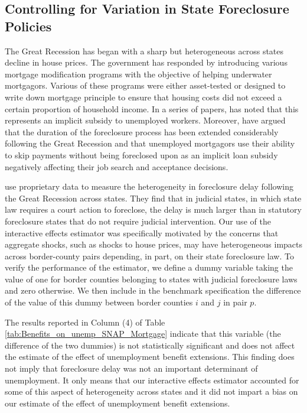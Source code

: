 \documentclass[12pt]{article}
\newcommand{\1}{\mathbf{1}}
\begin{document}
\begin{appendix}
\subsection{Controlling for Variation in State Foreclosure Policies}

The Great Recession has began with a sharp but heterogeneous across states decline in house prices. The government has responded by introducing various mortgage modification programs with the objective of helping underwater mortgagors. Various of these programs were either asset-tested or designed to write down mortgage principle to ensure that housing costs did not exceed a certain proportion of household income. In a series of papers, \citet{mulligan:08, mulligan:09, mulligan:10} has noted that this represents an implicit subsidy to unemployed workers. Moreover, \citet{herkenhoff+ohanian:13} have argued that the duration of the foreclosure process has been extended considerably following the Great Recession and that unemployed mortgagors use their ability to skip payments without being foreclosed upon as an implicit loan subsidy negatively affecting their job search and acceptance decisions.


\citet{cordell_etal:13} use proprietary data to measure the heterogeneity in foreclosure delay following the Great Recession across states. They find that in judicial states, in which state law requires a court action to foreclose, the delay is much larger than in statutory foreclosure states that do not require judicial intervention. Our use of the interactive effects estimator was specifically motivated by the concerns that aggregate shocks, such as shocks to house prices, may have heterogeneous impacts across border-county pairs depending, in part, on their state foreclosure law.  To verify the performance of the estimator, we define a dummy variable taking the value of one for border counties belonging to states with judicial foreclosure laws and zero otherwise. We then include in the benchmark specification the difference of the value of this dummy between border counties $i$ and $j$ in pair $p$.

The results reported in Column (4) of Table \ref{tab:Benefits_on_unemp_SNAP_Mortgage} indicate that this variable (the difference of the two dummies) is not statistically significant and does not affect the estimate of the effect of unemployment benefit extensions. This finding does not imply that foreclosure delay was not an important determinant of unemployment. It only means that our interactive effects estimator accounted for some of this aspect of heterogeneity across states and it did not impart a bias on our estimate of the effect of unemployment benefit extensions.




\end{appendix}
\end{document}
